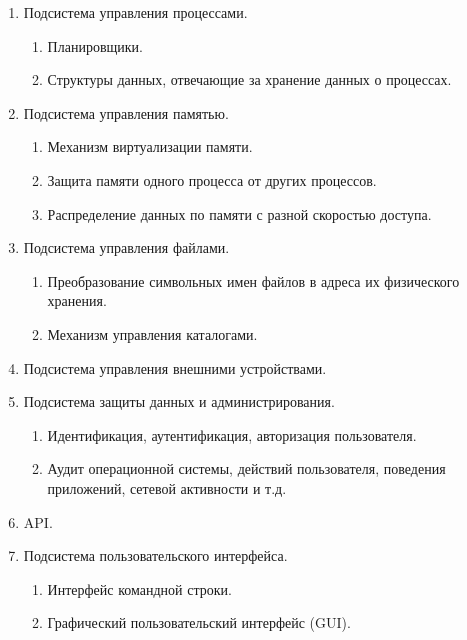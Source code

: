
\begin{enumerate}
\item
  Подсистема управления процессами.

  \begin{enumerate}
  \item
    Планировщики.

  \item
    Структуры данных, отвечающие за хранение данных о процессах.
  \end{enumerate}

\item
  Подсистема управления памятью.

  \begin{enumerate}
  \item
    Механизм виртуализации памяти.

  \item
    Защита памяти одного процесса от других процессов.

  \item
    Распределение данных по памяти с разной скоростью доступа. 
  \end{enumerate}

\item
  Подсистема управления файлами.

  \begin{enumerate}
  \item
    Преобразование символьных имен файлов в адреса их физического хранения.

  \item
    Механизм управления каталогами.
  \end{enumerate}

\item
  Подсистема управления внешними устройствами.

\item
  Подсистема защиты данных и администрирования.

  \begin{enumerate}
  \item
    Идентификация, аутентификация, авторизация пользователя.

  \item
    Аудит операционной системы, действий пользователя, поведения приложений,
    сетевой активности и т.д.
  \end{enumerate}

\item
  API.

\item
  Подсистема пользовательского интерфейса.

  \begin{enumerate}
  \item
    Интерфейс командной строки.

  \item
    Графический пользовательский интерфейс (GUI).
  \end{enumerate}
\end{enumerate}
